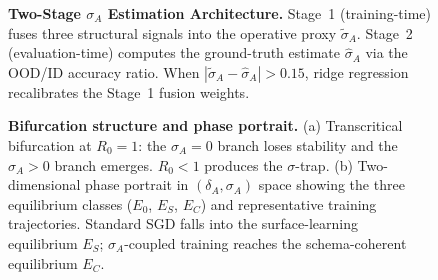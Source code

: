 \documentclass[10pt]{article}
\providecommand{\Description}[1]{}
\begin{document}
\begin{figure}[htbp]
\centering
\resizebox{0.9\textwidth}{!}{}
\caption{\textbf{Two-Stage $\sigma_A$ Estimation Architecture.}
Stage~1 (training-time) fuses three structural signals into the
operative proxy $\tilde{\sigma}_A$. Stage~2 (evaluation-time) computes
the ground-truth estimate $\hat{\sigma}_A$ via the OOD/ID accuracy
ratio. When $|\tilde{\sigma}_A - \hat{\sigma}_A| > 0.15$, ridge
regression recalibrates the Stage~1 fusion weights.}
\Description{Two-panel diagram. Stage 1 (training-time): three signal sources (GCA, RGA, AC) feed into a weighted fusion producing sigma_tilde_A. Stage 2 (evaluation-time): OOD and ID accuracy scores combine to form sigma_hat_A via the ratio Acc_OOD/Acc_ID. A dotted arrow shows recalibration feedback from Stage 2 back to the fusion weights when discrepancy exceeds 0.15.}
\label{fig:estimation}
\end{figure}

\begin{figure}[htbp]
\centering
\resizebox{0.95\textwidth}{!}{}
\caption{\textbf{Bifurcation structure and phase portrait.}
(a) Transcritical bifurcation at $R_0 = 1$: the $\sigma_A = 0$ branch
loses stability and the $\sigma_A > 0$ branch emerges. $R_0 < 1$
produces the $\sigma$-trap. (b) Two-dimensional phase portrait in
$(\delta_A, \sigma_A)$ space showing the three equilibrium classes
($E_0$, $E_S$, $E_C$) and representative training trajectories.
Standard SGD falls into the surface-learning equilibrium $E_S$;
$\sigma_A$-coupled training reaches the schema-coherent equilibrium
$E_C$.}
\Description{Two-panel figure. Panel (a): Bifurcation diagram showing sigma_A vs R_0. A solid line shows stable sigma=0 branch for R_0<1, which becomes dashed (unstable) after R_0=1. A stable positive-sigma branch emerges after the transcritical bifurcation point. Panel (b): 2D phase portrait in delta_A-sigma_A space with three equilibria marked (E_0 origin, E_S surface-learning trap at high delta/low sigma, E_C target at high delta/high sigma), delta and sigma nullclines, and two representative trajectories (SGD falls to E_S, sigma-coupled reaches E_C).}
\label{fig:bifurcation}
\end{figure}
\end{document}
